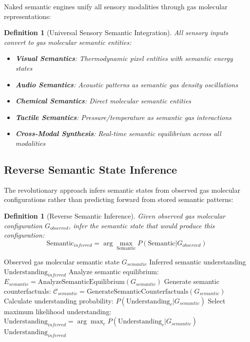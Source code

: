 \documentclass[11pt,a4paper]{article}
\newtheorem{definition}[theorem]{Definition}
\begin{document}
Naked semantic engines unify all sensory modalities through gas molecular representations:

\begin{definition}[Universal Sensory Semantic Integration]
All sensory inputs convert to gas molecular semantic entities:
\begin{itemize}
\item \textbf{Visual Semantics}: Thermodynamic pixel entities with semantic energy states
\item \textbf{Audio Semantics}: Acoustic patterns as semantic gas density oscillations  
\item \textbf{Chemical Semantics}: Direct molecular semantic entities
\item \textbf{Tactile Semantics}: Pressure/temperature as semantic gas interactions
\item \textbf{Cross-Modal Synthesis}: Real-time semantic equilibrium across all modalities
\end{itemize}
\end{definition}

\subsection{Reverse Semantic State Inference}

The revolutionary approach infers semantic states from observed gas molecular configurations rather than predicting forward from stored semantic patterns:

\begin{definition}[Reverse Semantic Inference]
Given observed gas molecular configuration $G_{observed}$, infer the semantic state that would produce this configuration:
\begin{equation}
\text{Semantic}_{inferred} = \arg\max_{\text{Semantic}} P(\text{Semantic} | G_{observed})
\end{equation}
\end{definition}

\begin{algorithm}
\caption{Reverse Semantic State Inference}
\begin{algorithmic}[1]
\REQUIRE Observed gas molecular semantic state $G_{semantic}$
\ENSURE Inferred semantic understanding $\text{Understanding}_{inferred}$
\STATE Analyze semantic equilibrium: $E_{semantic} = \text{AnalyzeSemanticEquilibrium}(G_{semantic})$
\STATE Generate semantic counterfactuals: $\mathcal{C}_{semantic} = \text{GenerateSemanticCounterfactuals}(G_{semantic})$
    \STATE Calculate understanding probability: $P(\text{Understanding}_c | G_{semantic})$
\ENDFOR
\STATE Select maximum likelihood understanding: $\text{Understanding}_{inferred} = \arg\max_c P(\text{Understanding}_c | G_{semantic})$
\RETURN $\text{Understanding}_{inferred}$
\end{algorithmic}
\end{algorithm}
\end{document}
